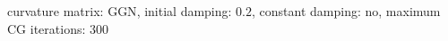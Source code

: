 curvature matrix: $\text{GGN}$, initial damping: $\num[scientific-notation=true]{0.2}$, constant damping: $\text{no}$, maximum CG iterations: $\num[scientific-notation=false]{300}$